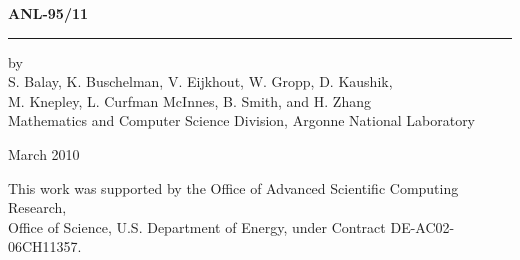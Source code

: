 \documentclass[twoside,11pt]{../sty/report_petsc}
\begin{document}



\hfill {\large{\bf ANL-95/11}}

\vspace*{3in}
\vspace*{8pt}
\hrule
\vspace*{8pt}

\vspace*{1in}
\noindent by \\
S. Balay, K. Buschelman, V. Eijkhout, W. Gropp, D. Kaushik, \\
M. Knepley, L. Curfman McInnes, B. Smith, and H. Zhang \\
Mathematics and Computer Science Division, Argonne National Laboratory

\vspace*{10pt}
\noindent March 2010

\vspace*{20pt}
\noindent This work was supported by the Office of Advanced Scientific Computing Research, \\
Office of Science, U.S. Department of Energy, under Contract DE-AC02-06CH11357.

\end{document}
